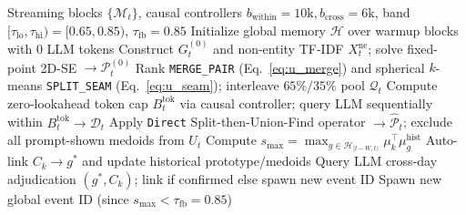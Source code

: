 \begin{algorithm}[t]
\caption{Strictly Causal \texttt{SUG-Meso} + \texttt{SUG-CrossLLM-v2} Pipeline}
\label{alg:sug_streaming}
\begin{algorithmic}[1]
\REQUIRE Streaming blocks $\{\mathcal{M}_t\}$, causal controllers $b_{\text{within}}=10\text{k}, b_{\text{cross}}=6\text{k}$, band $[\tau_{\text{lo}}, \tau_{\text{hi}}) = [0.65, 0.85)$, $\tau_{\text{fb}}=0.85$
\STATE Initialize global memory $\mathcal{H}$ over warmup blocks with $0$ LLM tokens
    \STATE Construct $G_t^{(0)}$ and non-entity TF-IDF $X_t^{\text{ne}}$; solve fixed-point 2D-SE $\rightarrow \mathcal{P}_t^{(0)}$
    \STATE Rank \texttt{MERGE\_PAIR} (Eq.~\ref{eq:u_merge}) and spherical $k$-means \texttt{SPLIT\_SEAM} (Eq.~\ref{eq:u_seam}); interleave $65\%/35\%$ pool $\mathcal{Q}_t$
    \STATE Compute zero-lookahead token cap $B_t^{\text{tok}}$ via causal controller; query LLM sequentially within $B_t^{\text{tok}} \rightarrow \mathcal{D}_t$
    \STATE Apply \texttt{Direct} Split-then-Union-Find operator $\rightarrow \widehat{\mathcal{P}}_t$; exclude all prompt-shown medoids from $U_t$
        \STATE Compute $s_{\max} = \max_{g \in \mathcal{H}_{[t-W,t)}} \mu_k^\top \mu_g^{\text{hist}}$
            \STATE Auto-link $C_k \to g^*$ and update historical prototype/medoids
            \STATE Query LLM cross-day adjudication $(g^*, C_k)$; link if confirmed else spawn new event ID
        \ELSE
            \STATE Spawn new global event ID (since $s_{\max} < \tau_{\text{fb}} = 0.85$)
        \ENDIF
    \ENDFOR
\ENDFOR
\end{algorithmic}
\end{algorithm}
